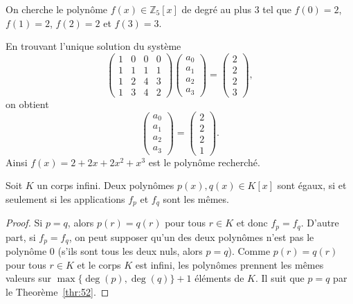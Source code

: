 \begin{example}
  \label{exe:38}
  On cherche le polynôme $f(x) ∈ ℤ_5[x]$ de degré au plus $3$ tel que
  $f(0) = 2$, $f(1)=2$, $f(2) = 2$ et $f(3) = 3$.

  En trouvant l'unique solution du système
  \begin{displaymath}
    \left(\begin{array}{rrrr}
1 & 0 & 0 & 0 \\
1 & 1 & 1 & 1 \\
1 & 2 & 4 & 3 \\
1 & 3 & 4 & 2
\end{array}\right)
\begin{pmatrix}
  a_0 \\ a_1 \\ a_2 \\ a_3
\end{pmatrix}
=
\begin{pmatrix}
  2 \\ 2 \\ 2 \\3
\end{pmatrix},
\end{displaymath}on obtient
\begin{displaymath}
  \begin{pmatrix}
  a_0 \\ a_1 \\ a_2 \\ a_3
\end{pmatrix} =
\begin{pmatrix}
  2 \\ 2 \\ 2 \\ 1
\end{pmatrix}.
\end{displaymath}
Ainsi $f(x) = 2 + 2x + 2x^2 + x^3$ est le polynôme recherché. 

\end{example}


\begin{corollary}
  \label{thr:42}
  Soit $K$ un corps infini. Deux polynômes $p(x),q(x) ∈ K[x]$ sont égaux, si et seulement si les applications $f_p$ et $f_q$ sont les mêmes.
\end{corollary}
\begin{proof}
  Si $p = q$, alors $p(r) = q(r)$ pour tous $r ∈K$ et donc $f_p = f_q$. D'autre part, si $f_p = f_q$, on peut supposer qu'un des deux polynômes n'est pas le polynôme $0$ (s'ils sont tous les deux nuls, alors $p=q$).  Comme $p(r) = q(r)$ pour tous $r ∈K$ et le corps $K$ est infini, les polynômes prennent les mêmes valeurs sur $\max\{\deg(p),\deg(q)\}+1$ éléments de $K$. Il suit que $p = q$ par le Theorème~\ref{thr:52}. 
\end{proof}


